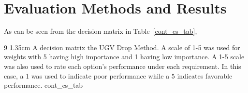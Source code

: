 \documentclass[]{auvsi_doc}
\begin{document}
\section{Evaluation Methods and Results}

As can be seen from the decision matrix in Table~\ref{cont_cs_tab}, 

\begin{AUVSITable}
{9}
{1.35cm}
{A decision matrix the UGV Drop Method. A scale of 1-5 was used for weights with 5 having high importance and 1 having low importance. A 1-5 scale was also used to rate each option’s performance under each requirement. In this case, a 1 was used to indicate poor performance while a 5 indicates favorable performance.}
{cont_cs_tab}


\end{AUVSITable}


\end{document}
